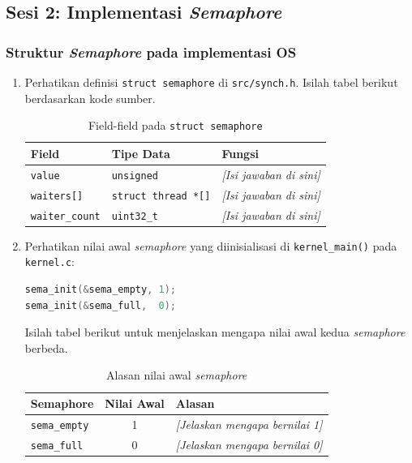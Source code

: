 \subsection{Sesi 2: Implementasi \textit{Semaphore}}

\subsubsection{Struktur \textit{Semaphore} pada implementasi OS}

\begin{enumerate}

	\item Perhatikan definisi \texttt{struct semaphore} di \texttt{src/synch.h}. Isilah tabel berikut berdasarkan kode sumber.

	      \begin{table}[htbp]
		      \centering
		      \caption{Field-field pada \texttt{struct semaphore}}
		      \begin{tabulary}{\textwidth}{|l|l|L|}
			      \hline
			      \textbf{Field} & \textbf{Tipe Data} & \textbf{Fungsi} \\ \hline
			      \texttt{value}         & \texttt{unsigned}           & \textit{[Isi jawaban di sini]} \\ \hline
			      \texttt{waiters[]}     & \texttt{struct thread *[]}  & \textit{[Isi jawaban di sini]} \\ \hline
			      \texttt{waiter\_count} & \texttt{uint32\_t}          & \textit{[Isi jawaban di sini]} \\ \hline
		      \end{tabulary}
	      \end{table}

	\item Perhatikan nilai awal \textit{semaphore} yang diinisialisasi di \texttt{kernel\_main()} pada \texttt{kernel.c}:
	      \begin{lstlisting}[language=C, caption={Inisialisasi \textit{semaphore} di \texttt{kernel\_main()}}]
sema_init(&sema_empty, 1);
sema_init(&sema_full,  0);
    \end{lstlisting}

	      Isilah tabel berikut untuk menjelaskan mengapa nilai awal kedua \textit{semaphore} berbeda.

	      \begin{table}[htbp]
		      \centering
		      \caption{Alasan nilai awal \textit{semaphore}}
		      \begin{tabulary}{\textwidth}{|l|c|L|}
			      \hline
			      \textbf{Semaphore} & \textbf{Nilai Awal} & \textbf{Alasan} \\ \hline
			      \texttt{sema\_empty} & 1 & \textit{[Jelaskan mengapa bernilai 1]} \\ \hline
			      \texttt{sema\_full}  & 0 & \textit{[Jelaskan mengapa bernilai 0]} \\ \hline
		      \end{tabulary}
	      \end{table}

\end{enumerate}

